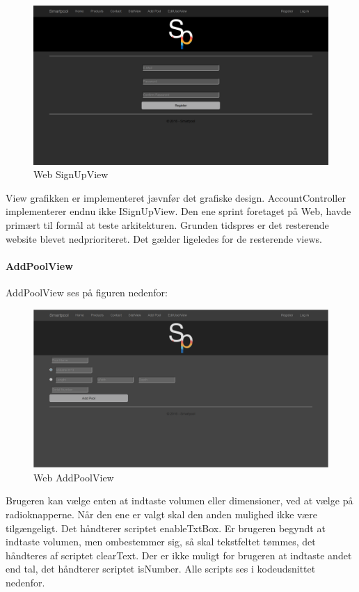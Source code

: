 \begin{figure}
	\centering
	\includegraphics[width=1.0\linewidth]{figs/implementering/web_signupview}
	\caption{Web SignUpView}
	\label{fig:websignupview}
\end{figure}

View grafikken er implementeret jævnfør det grafiske design. AccountController implementerer endnu ikke ISignUpView. Den ene sprint foretaget på Web, havde primært til formål at teste arkitekturen. Grunden tidspres er det resterende website blevet nedprioriteret. Det gælder ligeledes for de resterende views.

\paragraph{AddPoolView}
AddPoolView ses på figuren nedenfor:

\begin{figure}
	\centering
	\includegraphics[width=1.0\linewidth]{figs/implementering/web_addpoolview}
	\caption{Web AddPoolView}
	\label{fig:webaddpoolview}
\end{figure}

Brugeren kan vælge enten at indtaste volumen eller dimensioner, ved at vælge på radioknapperne. Når den ene er valgt skal den anden mulighed ikke være tilgængeligt. Det håndterer scriptet enableTxtBox. Er brugeren begyndt at indtaste volumen, men ombestemmer sig, så skal tekstfeltet tømmes, det håndteres af scriptet clearText. Der er ikke muligt for brugeren at indtaste andet end tal, det håndterer scriptet isNumber. Alle scripts ses i kodeudsnittet nedenfor.


